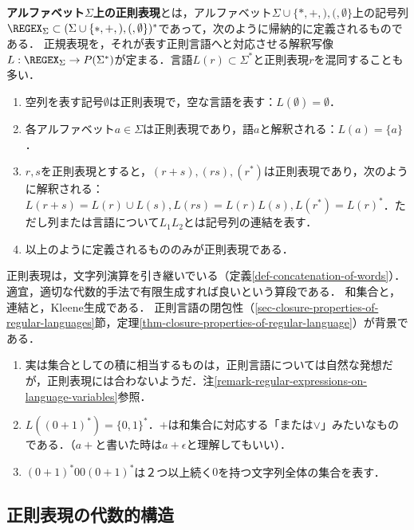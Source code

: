 \begin{definition}
    \textbf{アルファベット$\Sigma$上の正則表現}とは，アルファベット$\Sigma\cup\{*,+,),(,\emptyset\}$上の記号列$\REGEX_{\Sigma}\subset (\Sigma\cup\{*,+,),(,\emptyset\})^*$であって，次のように帰納的に定義されるものである．
    正規表現を，それが表す正則言語へと対応させる解釈写像$L:\REGEX_{\Sigma}\to P(\Sigma^*)$が定まる．言語$L(r)\subset\Sigma^*$と正則表現$r$を混同することも多い．
    \begin{enumerate}
        \item 空列を表す記号$\emptyset$は正則表現で，空な言語を表す：$L(\emptyset)=\emptyset$．
        \item 各アルファベット$a\in\Sigma$は正則表現であり，語$a$と解釈される：$L(a)=\{a\}$．
        \item $r,s$を正則表現とすると，$(r+s),(rs),(r^*)$は正則表現であり，次のように解釈される：$L(r+s)=L(r)\cup L(s), L(rs)=L(r)L(s),L(r^*)=L(r)^*$．ただし列または言語について$L_1L_2$とは記号列の連結を表す．
        \item 以上のように定義されるもののみが正則表現である．
    \end{enumerate}
\end{definition}
\begin{remarks}
    正則表現は，文字列演算を引き継いでいる（定義\ref{def-concatenation-of-words}）．
    適宜，適切な代数的手法で有限生成すれば良いという算段である．
    和集合と，連結と，Kleene生成である．
    正則言語の閉包性（\ref{sec-closure-properties-of-regular-languages}節，定理\ref{thm-closure-properties-of-regular-language}）が背景である．
\end{remarks}
\begin{example}\mbox{}
    \begin{enumerate}
        \item 実は集合としての積に相当するものは，正則言語については自然な発想だが，正則表現には合わないようだ．注\ref{remark-regular-expressions-on-language-variables}参照．
        \item $L((0+1)^*)=\{0,1\}^*$．$+$は和集合に対応する「または$\lor$」みたいなものである．（$a+$と書いた時は$a+\epsilon$と理解してもいい）．
        \item $(0+1)^*00(0+1)^*$は２つ以上続く$0$を持つ文字列全体の集合を表す．
    \end{enumerate}
\end{example}

\subsection{正則表現の代数的構造}

